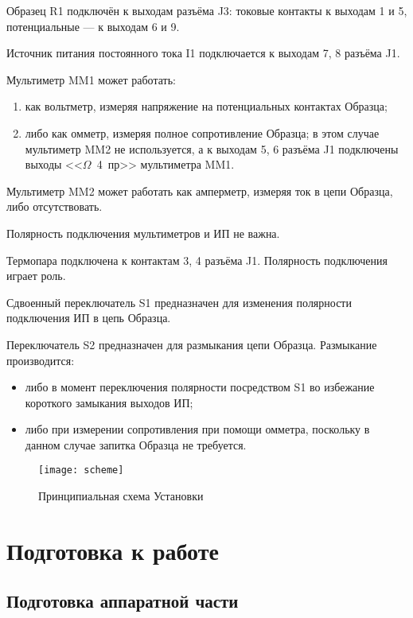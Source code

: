 \documentclass[12pt, a4paper, twocolumn]{report}
\begin{document}
Образец R1 подключён к выходам разъёма J3: токовые контакты к выходам 1 и 5, потенциальные --- к выходам 6 и 9.

Источник питания постоянного тока I1 подключается к выходам 7, 8 разъёма J1.

Мультиметр MM1 может работать:

\begin{enumerate}
\item как вольтметр, измеряя напряжение на потенциальных контактах Образца;
\item либо как омметр, измеряя полное сопротивление Образца; в этом случае мультиметр MM2 не используется, а к выходам 5, 6 разъёма J1 подключены выходы <<$\Omega$~4~пр>> мультиметра MM1.
\end{enumerate}

Мультиметр MM2 может работать как амперметр, измеряя ток в цепи Образца, либо отсутствовать.

Полярность подключения мультиметров и ИП не важна.

Термопара подключена к контактам 3, 4 разъёма J1. Полярность подключения играет роль.

Сдвоенный переключатель S1 предназначен для изменения полярности подключения ИП в цепь Образца.

Переключатель S2 предназначен для размыкания цепи Образца. Размыкание производится:

\begin{itemize}
\item либо в момент переключения полярности посредством S1 во избежание короткого замыкания выходов ИП;
\item либо при измерении сопротивления при помощи омметра, поскольку в данном случае запитка Образца не требуется.
\end{itemize}

\begin{figure*}
\begin{center}
\texttt{[image: scheme]}
\end{center}
\caption{Принципиальная схема Установки}
\label{pic-scheme}
\end{figure*}

\chapter{Подготовка к работе}

\section{Подготовка аппаратной части}
\end{document}
